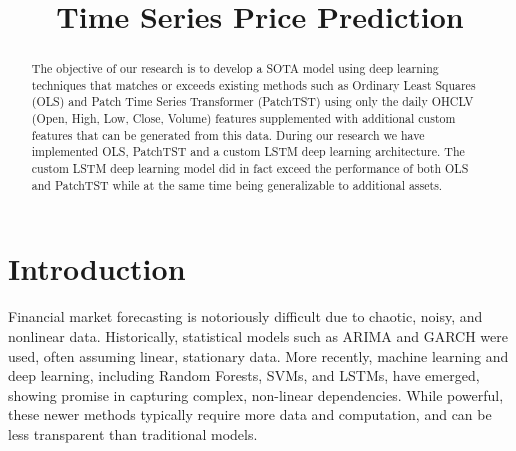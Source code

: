 \documentclass[conference]{IEEEtran}
\begin{document}
\title{Time Series Price Prediction}

\author{
\and
{}
\and
{}
}

\maketitle

\begin{abstract}
The objective of our research is to develop a SOTA model using deep learning techniques that matches or exceeds existing methods such as Ordinary Least Squares (OLS) and Patch Time Series Transformer (PatchTST) using only the daily OHCLV (Open, High, Low, Close, Volume) features supplemented with additional custom features that can be generated from this data.  During our research we have implemented OLS, PatchTST and a custom LSTM deep learning architecture.  The custom LSTM deep learning model did in fact exceed the performance of both OLS and PatchTST while at the same time being generalizable to additional assets.
\end{abstract}

\section{Introduction}

Financial market forecasting is notoriously difficult due to chaotic, noisy, and nonlinear data. Historically, statistical models such as ARIMA and GARCH were used, often assuming linear, stationary data. More recently, machine learning and deep learning, including Random Forests, SVMs, and LSTMs, have emerged, showing promise in capturing complex, non-linear dependencies. While powerful, these newer methods typically require more data and computation, and can be less transparent than traditional models.
\end{document}
